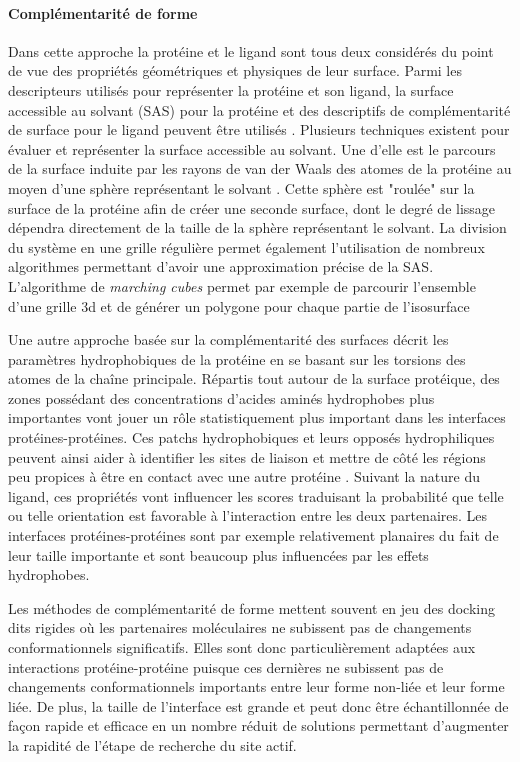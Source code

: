 \paragraph{Complémentarité de forme}

Dans cette approche la protéine et le ligand sont tous deux considérés du point de vue des propriétés géométriques et physiques de leur surface. Parmi les descripteurs utilisés pour représenter la protéine et son ligand, la surface accessible au solvant (SAS) pour la protéine et des descriptifs de complémentarité de surface pour le ligand peuvent être utilisés \cite{shoichet1992molecular}. Plusieurs techniques existent pour évaluer et représenter la surface accessible au solvant. Une d'elle est le parcours de la surface induite par les rayons de van der Waals des atomes de la protéine au moyen d'une sphère représentant le solvant \cite{connolly1983analytical}. Cette sphère est "roulée" sur la surface de la protéine afin de créer une seconde surface, dont le degré de lissage dépendra directement de la taille de la sphère représentant le solvant. La division du système en une grille régulière permet également l'utilisation de nombreux algorithmes permettant d'avoir une approximation précise de la SAS. L'algorithme de \textit{marching cubes} permet par exemple de parcourir l'ensemble d'une grille 3d et de générer un polygone pour chaque partie de l'isosurface 

Une autre approche basée sur la complémentarité des surfaces décrit les paramètres hydrophobiques de la protéine en se basant sur les torsions des atomes de la chaîne principale. Répartis tout autour de la surface protéique, des zones possédant des concentrations d'acides aminés hydrophobes plus importantes vont jouer un rôle statistiquement plus important dans les interfaces protéines-protéines. Ces patchs hydrophobiques et leurs opposés hydrophiliques peuvent ainsi aider à identifier les sites de liaison et mettre de côté les régions peu propices à être en contact avec une autre protéine \cite{jones1996principles}. Suivant la nature du ligand, ces propriétés vont influencer les scores traduisant la probabilité que telle ou telle orientation est favorable à l'interaction entre les deux partenaires. Les interfaces protéines-protéines sont par exemple relativement planaires du fait de leur taille importante et sont beaucoup plus influencées par les effets hydrophobes.

Les méthodes de complémentarité de forme mettent souvent en jeu des docking dits rigides où les partenaires moléculaires ne subissent pas de changements conformationnels significatifs. Elles sont donc particulièrement adaptées aux interactions protéine-protéine puisque ces dernières ne subissent pas de changements conformationnels importants entre leur forme non-liée et leur forme liée. De plus, la taille de l'interface est grande et peut donc être échantillonnée de façon rapide et efficace en un nombre réduit de solutions permettant d'augmenter la rapidité de l'étape de recherche du site actif. 

